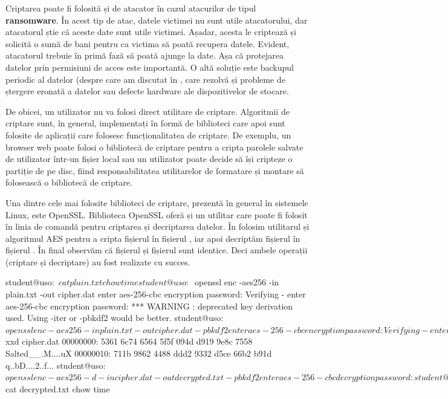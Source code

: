Criptarea poate fi folosită și de atacator în cazul atacurilor de tipul \textbf{ransomware}. În acest tip de atac, datele victimei nu sunt utile atacatorului, dar atacatorul știe că aceste date sunt utile victimei. Așadar, acesta le criptează și solicită o sumă de bani pentru ca victima să poată recupera datele. Evident, atacatorul trebuie în primă fază să poată ajunge la date. Așa că protejarea datelor prin permisiuni de acces este importantă. O altă soluție este backupul periodic al datelor (despre care am discutat în , care rezolvă și probleme de ștergere eronată a datelor sau defecte hardware ale dispozitivelor de stocare.

De obicei, un utilizator nu va folosi direct utilitare de criptare. Algoritmii de criptare sunt, în general, implementați în formă de biblioteci care apoi sunt folosite de aplicații care folosesc funcționalitatea de criptare. De exemplu, un browser web poate folosi o bibliotecă de criptare pentru a cripta parolele salvate de utilizator într-un fișier local sau un utilizator poate decide să își cripteze o partiție de pe disc, fiind responsabilitatea utilitarelor de formatare și montare să folosească o bibliotecă de criptare.

Una dintre cele mai folosite biblioteci de criptare, prezentă în general în sistemele Linux, este OpenSSL. Biblioteca OpenSSL oferă și un utilitar care poate fi folosit în linia de comandă pentru criptarea și decriptarea datelor. În  folosim utilitarul  și algoritmul AES pentru a cripta fișierul  în fișierul , iar apoi decriptăm fișierul  în fișierul . În final observăm că fișierul  și fișierul  sunt identice. Deci ambele operații (criptare și decriptare) au fost realizate cu succes.

\begin{screen}[caption={Criptare și decriptare folosind openssl},label={lst:sec:openssl}]
student@uso:~$ cat plain.txt
chow time
student@uso:~$ openssl enc -aes256 -in plain.txt -out cipher.dat
enter aes-256-cbc encryption password:
Verifying - enter aes-256-cbc encryption password:
*** WARNING : deprecated key derivation used.
Using -iter or -pbkdf2 would be better.
student@uso:~$ openssl enc -aes256 -in plain.txt -out cipher.dat -pbkdf2
enter aes-256-cbc encryption password:
Verifying - enter aes-256-cbc encryption password:
student@uso:~$ xxd cipher.dat
00000000: 5361 6c74 6564 5f5f 094d d919 9e8c 7558  Salted__.M....uX
00000010: 711b 9862 4488 ddd2 9332 d5ce 66b2 b91d  q..bD....2..f...
student@uso:~$ openssl enc -aes256 -d -in cipher.dat -out decrypted.txt -pbkdf2
enter aes-256-cbc decryption password:
student@uso:~$ cat decrypted.txt
chow time
\end{screen}

